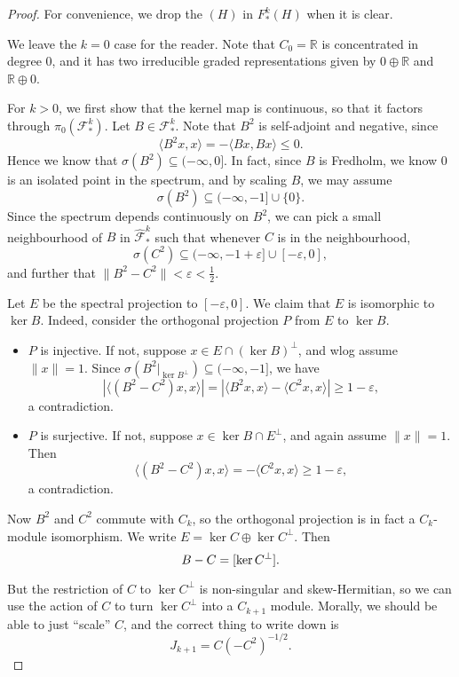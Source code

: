 \documentclass{shortart}
\theoremstyle{definition}
\newcommand\R{\mathbb{R}}
\newcommand\bra\langle
\newcommand\ket\rangle
\let\index\relax
\DeclareMathOperator{\index}{idx}
\begin{document}
\begin{proof}
  For convenience, we drop the $(H)$ in $F^k_*(H)$ when it is clear.

  We leave the $k = 0$ case for the reader. Note that $C_0 = \R$ is concentrated in degree $0$, and it has two irreducible graded representations given by $0 \oplus \R$ and $\R \oplus 0$.

  For $k > 0$, we first show that the kernel map is continuous, so that it factors through $\pi_0(\mathcal{F}_*^k)$. Let $B \in \mathcal{F}^k_*$. Note that $B^2$ is self-adjoint and negative, since
  \[
    \bra B^2 x, x\ket = -\bra Bx, Bx\ket \leq 0.
  \]
  Hence we know that $\sigma(B^2) \subseteq (-\infty, 0]$. In fact, since $B$ is Fredholm, we know $0$ is an isolated point in the spectrum, and by scaling $B$, we may assume
  \[
    \sigma(B^2) \subseteq (-\infty, -1] \cup \{0\}.
  \]
  Since the spectrum depends continuously on $B^2$, we can pick a small neighbourhood of $B$ in $\hat{\mathcal{F}}^k_*$ such that whenever $C$ is in the neighbourhood,
  \[
    \sigma(C^2) \subseteq (-\infty, -1 + \varepsilon] \cup [-\varepsilon, 0],
  \]
  and further that $\|B^2 - C^2\| < \varepsilon < \frac{1}{2}$.

  Let $E$ be the spectral projection to $[-\varepsilon, 0]$. We claim that $E$ is isomorphic to $\ker B$. Indeed, consider the orthogonal projection $P$ from $E$ to $\ker B$.
  \begin{itemize}
    \item $P$ is injective. If not, suppose $x \in E \cap (\ker B)^\perp$, and wlog assume $\|x\| = 1$. Since $\sigma(B^2|_{\ker B^\perp}) \subseteq (-\infty, -1]$, we have
      \[
        |\bra (B^2 - C^2)x, x\ket| = |\bra B^2 x, x\ket - \bra C^2 x, x\ket| \geq 1 - \varepsilon,
      \]
      a contradiction.
    \item $P$ is surjective. If not, suppose $x \in \ker B \cap E^\perp$, and again assume $\|x\| = 1$. Then
      \[
        \bra (B^2 - C^2)x, x\ket = -\bra C^2 x, x\ket \geq 1 - \varepsilon,
      \]
      a contradiction.
  \end{itemize}
  Now $B^2$ and $C^2$ commute with $C_k$, so the orthogonal projection is in fact a $C_k$-module isomorphism. We write $E = \ker C \oplus \ker C^\perp$. Then
  \[
    \index B - \index C = [\ker C^\perp].
  \]

  But the restriction of $C$ to $\ker C^\perp$ is non-singular and skew-Hermitian, so we can use the action of $C$ to turn $\ker C^\perp$ into a $C_{k + 1}$ module. Morally, we should be able to just ``scale'' $C$, and the correct thing to write down is
  \[
    J_{k + 1} = C (-C^2)^{-1/2}.
  \]


\end{proof}
\end{document}
